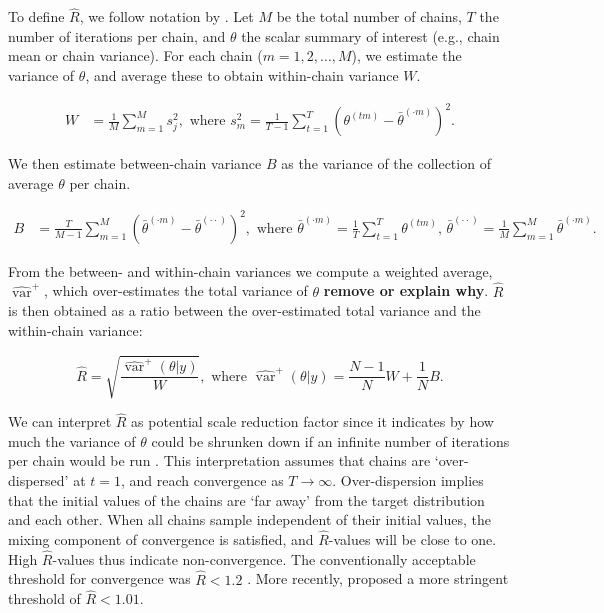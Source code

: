 \documentclass[Royal,times,sageh]{sagej}
\begin{document}
To define \(\widehat{R}\), we follow notation by \citep[p.~5]{veht19}.
Let \(M\) be the total number of chains, \(T\) the number of iterations
per chain, and \(\theta\) the scalar summary of interest (e.g., chain
mean or chain variance). For each chain (\(m = 1, 2, \dots, M\)), we
estimate the variance of \(\theta\), and average these to obtain
within-chain variance \(W\).

\begin{align*}
W&=\frac{1}{M} \sum_{m=1}^{M} s_{j}^{2}, \text { where } s_{m}^{2}=\frac{1}{T-1} \sum_{t=1}^{T}\left(\theta^{(t m)}-\bar{\theta}^{(\cdot m)}\right)^{2}. 
\end{align*}

We then estimate between-chain variance \(B\) as the variance of the
collection of average \(\theta\) per chain.

\begin{align*}
B&=\frac{T}{M-1} \sum_{m=1}^{M}\left(\bar{\theta}^{(\cdot m)}-\bar{\theta}^{(\cdot \cdot)}\right)^{2}, \text { where } \bar{\theta}^{(\cdot m)}=\frac{1}{T} \sum_{t=1}^{T} \theta^{(t m)} \text{, } \bar{\theta}^{(\cdot \cdot)}=\frac{1}{M} \sum_{m=1}^{M} \bar{\theta}^{(\cdot m)}. 
\end{align*}

From the between- and within-chain variances we compute a weighted
average, \(\widehat{\operatorname{var}}^{+}\), which over-estimates the
total variance of \(\theta\) \textbf{remove or explain why}.
\(\widehat{R}\) is then obtained as a ratio between the over-estimated
total variance and the within-chain variance:

\begin{equation*}
\widehat{R}=\sqrt{\frac{\widehat{\operatorname{var}}^{+}(\theta | y)}{W}},
\text{ where } \widehat{\operatorname{var}}^{+}(\theta | y)=\frac{N-1}{N} W+\frac{1}{N} B.
\end{equation*}

We can interpret \(\widehat{R}\) as potential scale reduction factor
since it indicates by how much the variance of \(\theta\) could be
shrunken down if an infinite number of iterations per chain would be run
\citep{gelm92}. This interpretation assumes that chains are
`over-dispersed' at \(t=1\), and reach convergence as \(T \to \infty\).
Over-dispersion implies that the initial values of the chains are `far
away' from the target distribution and each other. When all chains
sample independent of their initial values, the mixing component of
convergence is satisfied, and \(\widehat{R}\)-values will be close to
one. High \(\widehat{R}\)-values thus indicate non-convergence. The
conventionally acceptable threshold for convergence was
\(\widehat{R} < 1.2\) \citep{gelm92}. More recently, \citet{veht19}
proposed a more stringent threshold of \(\widehat{R} < 1.01\).
\end{document}
